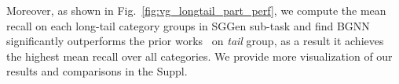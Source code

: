 
Moreover, as shown in Fig.~\ref{fig:vg_longtail_part_perf}, we compute the mean recall on each long-tail category groups in SGGen sub-task and find BGNN significantly outperforms the prior works~\cite{lin_gps-net_2020, tang_unbiased_2020} on \textit{tail} group, as a result it achieves the highest mean recall over all categories.
We provide more visualization of our results and comparisons in the Suppl.



